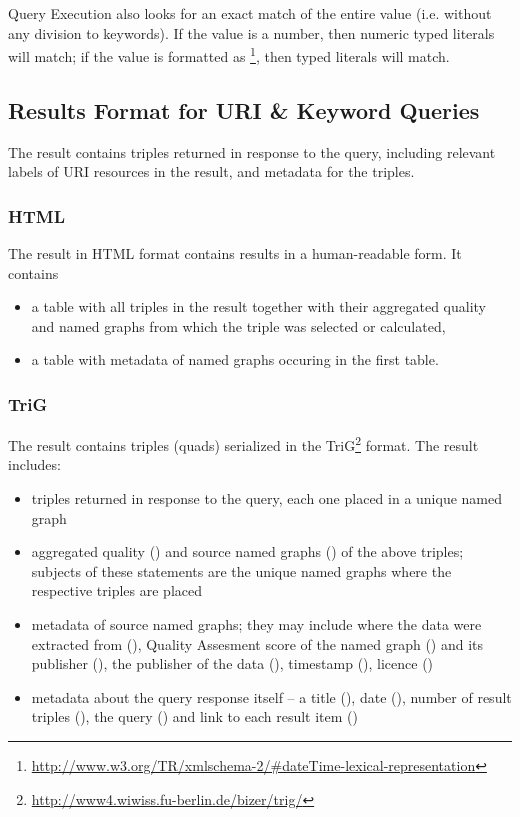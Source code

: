 Query Execution also looks for an exact match of the entire  value (i.e. without any division to keywords). If the  value is a number, then numeric typed literals will match; if the  value is formatted as \footnote{\url{http://www.w3.org/TR/xmlschema-2/\#dateTime-lexical-representation}}, then  typed literals will match.

\subsection{Results Format for URI \& Keyword Queries}
The result contains triples returned in response to the query, including relevant labels of URI resources in the result, and metadata for the triples.

\subsubsection{HTML}

The result in HTML format contains results in a human-readable form. It contains

\begin{itemize}
	\item a table with all triples in the result together with their aggregated quality and named graphs from which the triple was selected or calculated,
  \item  a table with metadata of named graphs occuring in the first table.
\end{itemize}

\subsubsection{TriG}

The result contains triples (quads) serialized in the TriG\footnote{\url{http://www4.wiwiss.fu-berlin.de/bizer/trig/}} format. The result includes:

\begin{itemize}
	\item triples returned in response to the query, each one placed in a unique named graph
  \item aggregated quality () and source named graphs () of the above triples; subjects of these statements are the unique named graphs where the respective triples are placed
  \item  metadata of source named graphs; they may include where the data were extracted from (), Quality Assesment score of the named graph () and its publisher (), the publisher of the data (), timestamp (), licence ()
  \item  metadata about the query response itself -- a title (), date (), number of result triples (), the query () and link to each result item ()
\end{itemize}

